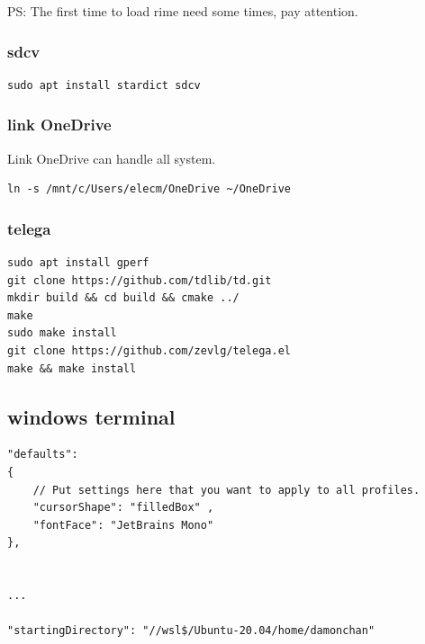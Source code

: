 \documentclass[11pt]{article}
\begin{document}
PS: The first time to load rime need some times, pay attention.
\subsubsection{sdcv}
\label{sec:orgbf02ca9}
\begin{verbatim}
sudo apt install stardict sdcv
\end{verbatim}
\subsubsection{link OneDrive}
\label{sec:orga1e9213}
Link OneDrive can handle all system.
\begin{verbatim}
ln -s /mnt/c/Users/elecm/OneDrive ~/OneDrive
\end{verbatim}
\subsubsection{telega}
\label{sec:org8a9565f}
\begin{verbatim}
sudo apt install gperf
git clone https://github.com/tdlib/td.git
mkdir build && cd build && cmake ../
make
sudo make install
git clone https://github.com/zevlg/telega.el
make && make install
\end{verbatim}

\subsection{windows terminal}
\label{sec:orgd3a3a5e}
\begin{verbatim}
"defaults":
{
    // Put settings here that you want to apply to all profiles.
    "cursorShape": "filledBox" ,
    "fontFace": "JetBrains Mono"
},


...

"startingDirectory": "//wsl$/Ubuntu-20.04/home/damonchan"
\end{verbatim}
\end{document}
